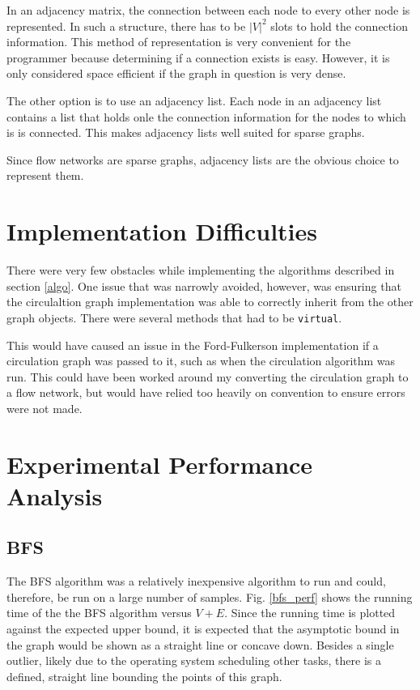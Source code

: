 \documentclass[conference]{IEEEtran}
\begin{document}
In an adjacency matrix, the connection between each node to every other node is represented.
In such a structure, there has to be $|V|^2$ slots to hold the connection information. This
method of representation is very convenient for the programmer because determining if a 
connection exists is easy. However, it is only considered space efficient if the graph in
question is very dense. 

The other option is to use an adjacency list. Each node in an adjacency list contains a list 
that holds onle the connection information for the nodes to which is is connected. This makes 
adjacency lists well suited for sparse graphs. 

Since flow networks are sparse graphs, adjacency lists are the obvious choice to represent them.

\section{Implementation Difficulties} %
There were very few obstacles while implementing the algorithms described in section 
\ref{algo}. One issue that was narrowly avoided, however, was ensuring that the circulaltion
graph implementation was able to correctly inherit from the other graph objects. There
were several methods that had to be \lstinline{virtual}. 

This would have caused an issue in the Ford-Fulkerson implementation if a circulation graph
was passed to it, such as when the circulation algorithm was run. This could have been 
worked around my converting the circulation graph to a flow network, but would have relied
too heavily on convention to ensure errors were not made.


\section{Experimental Performance Analysis}
\subsection{BFS}
The BFS algorithm was a relatively inexpensive algorithm to run and could, therefore,
be run on a large number of samples. Fig. \ref{bfs_perf} shows the running time of the 
the BFS algorithm versus $V + E$. Since the running time is plotted against the expected
upper bound, it is expected that the asymptotic bound in the graph would be shown as a 
straight line or concave down. Besides a single outlier, likely due to the operating 
system scheduling other tasks, there is a defined, straight line bounding the points of 
this graph. 
\end{document}
